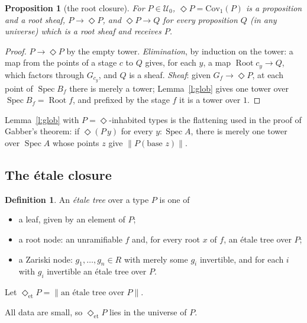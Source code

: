 \documentclass[11pt]{amsart}
\newtheorem{proposition}[theorem]{Proposition}
\theoremstyle{definition}
\newtheorem{definition}[theorem]{Definition}
\theoremstyle{remark}
\newcommand{\Spec}{\operatorname{Spec}}
\newcommand{\Root}{\operatorname{Root}}
\newcommand{\close}{\Diamond}
\newcommand{\closeE}{\Diamond_{\mathrm{et}}}
\newcommand{\tr}[1]{\|#1\|}
\newcommand{\U}{\mathcal U}
\begin{document}
\begin{proposition}[the root closure]\label{p:close}
For $P\in\U_0$, $\close P=\mathrm{Cov}_1(P)$ is a proposition and a root
sheaf, $P\to\close P$, and $\close P\to Q$ for every proposition $Q$ (in
any universe) which is a root sheaf and receives $P$.
\end{proposition}
\begin{proof}
$P\to\close P$ by the empty tower. \emph{Elimination}, by induction on the
tower: a map from the points of a stage $c$ to $Q$ gives, for each $y$, a
map $\Root c_y\to Q$, which factors through $G_{c_y}$, and $Q$ is a sheaf.
\emph{Sheaf}: given $G_f\to\close P$, at each point of $\Spec B_f$ there
is merely a tower; Lemma~\ref{l:glob} gives one tower over
$\Spec B_f=\Root f$, and prefixed by the stage $f$ it is a tower over $1$.
\end{proof}

Lemma~\ref{l:glob} with $P=\close$-inhabited types is the flattening used
in the proof of Gabber's theorem: if $\close(P\,y)$ for every $y:\Spec A$,
there is merely one tower over $\Spec A$ whose points $z$ give
$\tr{P(\text{base }z)}$.

\subsection{The \'etale closure}

\begin{definition}
An \emph{\'etale tree} over a type $P$ is one of
\begin{itemize}
\item a leaf, given by an element of $P$;
\item a root node: an unramifiable $f$ and, for every root $x$ of $f$, an
\'etale tree over $P$;
\item a Zariski node: $g_1,\dots,g_n\in R$ with merely some $g_i$
invertible, and for each $i$ with $g_i$ invertible an \'etale tree over $P$.
\end{itemize}
Let $\closeE P=\tr{\text{an \'etale tree over }P}$.
\end{definition}

All data are small, so $\closeE P$ lies in the universe of $P$.
\end{document}
